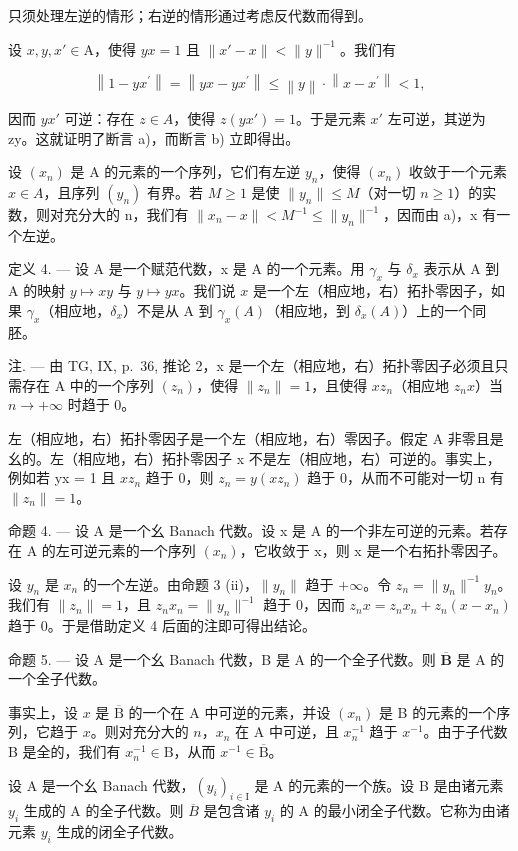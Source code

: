 只须处理左逆的情形；右逆的情形通过考虑反代数而得到。

设 \(x, y, x' \in \mathrm{A}\)，使得 \(yx = 1\) 且 \(\|x' - x\| < \|y\|^{-1}\)。我们有

\[
\left\| 1 - y x ^ {\prime} \right\| = \left\| y x - y x ^ {\prime} \right\| \leqslant \left\| y \right\| \cdot \left\| x - x ^ {\prime} \right\| <   1,
\]

因而 \(yx'\) 可逆：存在 \(z \in A\)，使得 \(z(yx') = 1\)。于是元素 \(x'\) 左可逆，其逆为 zy。这就证明了断言 a)，而断言 b) 立即得出。

  设 \((x_{n})\) 是 A 的元素的一个序列，它们有左逆 \(y_{n}\)，使得 \((x_{n})\) 收敛于一个元素 \(x \in A\)，且序列 \((y_{n})\) 有界。若 \(M \geqslant 1\) 是使 \(\|y_{n}\| \leqslant M\)（对一切 \(n \geqslant 1\)）的实数，则对充分大的 n，我们有 \(\|x_{n} - x\| < M^{-1} \leqslant \|y_{n}\|^{-1}\)，因而由 a)，x 有一个左逆。

定义 4. --- 设 A 是一个赋范代数，x 是 A 的一个元素。用 \(\gamma_x\) 与 \(\delta_x\) 表示从 A 到 A 的映射 \(y \mapsto xy\) 与 \(y \mapsto yx\)。我们说 \(x\) 是一个左（相应地，右）拓扑零因子，如果 \(\gamma_x\)（相应地，\(\delta_x\)）不是从 A 到 \(\gamma_x(A)\)（相应地，到 \(\delta_x(A)\)）上的一个同胚。

注. --- 由 TG, IX, p.~36, 推论 2，x 是一个左（相应地，右）拓扑零因子必须且只需存在 A 中的一个序列 \((z_{n})\)，使得 \(\|z_{n}\|=1\)，且使得 \(xz_{n}\)（相应地 \(z_{n}x\)）当 \(n\to+\infty\) 时趋于 0。

左（相应地，右）拓扑零因子是一个左（相应地，右）零因子。假定 A 非零且是幺的。左（相应地，右）拓扑零因子 x 不是左（相应地，右）可逆的。事实上，例如若 yx = 1 且 \(xz_{n}\) 趋于 0，则 \(z_{n} = y(xz_{n})\) 趋于 0，从而不可能对一切 n 有 \(\|z_{n}\| = 1\)。

命题 4. --- 设 A 是一个幺 Banach 代数。设 x 是 A 的一个非左可逆的元素。若存在 A 的左可逆元素的一个序列 \((x_{n})\)，它收敛于 x，则 x 是一个右拓扑零因子。

设 \(y_{n}\) 是 \(x_{n}\) 的一个左逆。由命题 3 (ii)，\(\|y_{n}\|\) 趋于 \(+\infty\)。令 \(z_{n} = \|y_{n}\|^{-1}y_{n}\)。我们有 \(\|z_{n}\| = 1\)，且 \(z_{n}x_{n} = \|y_{n}\|^{-1}\) 趋于 0，因而 \(z_{n}x = z_{n}x_{n} + z_{n}(x - x_{n})\) 趋于 0。于是借助定义 4 后面的注即可得出结论。

命题 5. --- 设 A 是一个幺 Banach 代数，B 是 A 的一个全子代数。则 \(\overline{\mathbf{B}}\) 是 A 的一个全子代数。

事实上，设 \(x\) 是 \(\overline{\mathrm{B}}\) 的一个在 A 中可逆的元素，并设 \((x_n)\) 是 B 的元素的一个序列，它趋于 \(x\)。则对充分大的 \(n\)，\(x_n\) 在 A 中可逆，且 \(x_n^{-1}\) 趋于 \(x^{-1}\)。由于子代数 B 是全的，我们有 \(x_n^{-1} \in \mathrm{B}\)，从而 \(x^{-1} \in \overline{\mathrm{B}}\)。

设 A 是一个幺 Banach 代数，\((y_{i})_{i\in\mathrm{I}}\) 是 A 的元素的一个族。设 B 是由诸元素 \(y_{i}\) 生成的 A 的全子代数。则 \(\overline{B}\) 是包含诸 \(y_{i}\) 的 A 的最小闭全子代数。它称为由诸元素 \(y_{i}\) 生成的闭全子代数。

